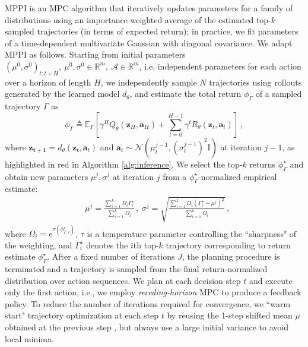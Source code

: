 \documentclass{article}
\begin{document}
MPPI is an MPC algorithm that iteratively updates parameters for a family of distributions using an importance weighted average of the estimated top-$k$ sampled trajectories (in terms of expected return); in practice, we fit parameters of a time-dependent multivariate Gaussian with diagonal covariance. We adapt MPPI as follows. Starting from initial parameters $(\mu^{0}, \sigma^{0})_{t:t+H},~\mu^{0},\sigma^{0} \in \mathbb{R}^{m},~\mathcal{A} \in \mathbb{R}^{m}$, i.e. independent parameters for each action over a horizon of length $H$, we independently sample $N$ trajectories using rollouts generated by the learned model $d_{\theta}$, and estimate the total return $\phi_{\Gamma}$ of a sampled trajectory $\Gamma$ as
\begin{equation}
    \label{eq:mppi-return}
    \phi_{\Gamma} \triangleq \mathbb{E}_{\Gamma}\left[ \gamma^{H} Q_{\theta}(\mathbf{z}_{H}, \mathbf{a}_{H}) + \sum_{t=0}^{H-1} \gamma^{t} R_{\theta}(\mathbf{z}_{t}, \mathbf{a}_{t}) \right]\,,
\end{equation}
where $\mathbf{z_{t+1}} = d_{\theta}(\mathbf{z}_{t}, \mathbf{a}_{t})$ and $\mathbf{a}_{t} \sim \mathcal{N}(\mu^{j-1}_{t}, (\sigma^{j-1}_{t})^{2} \mathrm{I})$ at iteration $j-1$, as highlighted in {\color{BrickRed}red} in Algorithm \ref{alg:inference}. We select the top-$k$ returns $\phi_{\Gamma}^{\star}$ and obtain new parameters $\mu^{j},\sigma^{j}$ at iteration $j$ from a $\phi_{\Gamma}^{\star}$-normalized empirical estimate:
\begin{align}
    \label{eq:mppi-return-norm}
    &\mu^{j} = \frac{\sum_{i=1}^{k} \Omega_{i} \Gamma_{i}^{\star}}{\sum_{i=1}^{k} \Omega_{i}}\,,~
    \sigma^{j} = \sqrt{\frac{\sum_{i=1}^{k} \Omega_{i} (\Gamma_{i}^{\star} - \mu^{j})^{2}}{\sum_{i=1}^{k} \Omega_{i}}}\,,
\end{align}
where $\Omega_{i} = e^{\tau (\phi_{\Gamma,i}^{\star})}$, $\tau$ is a temperature parameter controlling the ``sharpness" of the weighting, and $\Gamma_{i}^{\star}$ denotes the $i$th top-$k$ trajectory corresponding to return estimate $\phi_{\Gamma}^{\star}$. After a fixed number of iterations $J$, the planning procedure is terminated and a trajectory is sampled from the final return-normalized distribution over action sequences. We plan at each decision step $t$ and execute only the first action, i.e., we employ \emph{receding-horizon} MPC to produce a feedback policy. To reduce the number of iterations required for convergence, we ``warm start" trajectory optimization at each step $t$ by reusing the 1-step shifted mean $\mu$ obtained at the previous step \citep{Argenson2021ModelBasedOP}, but always use a large initial variance to avoid local minima.
\end{document}

